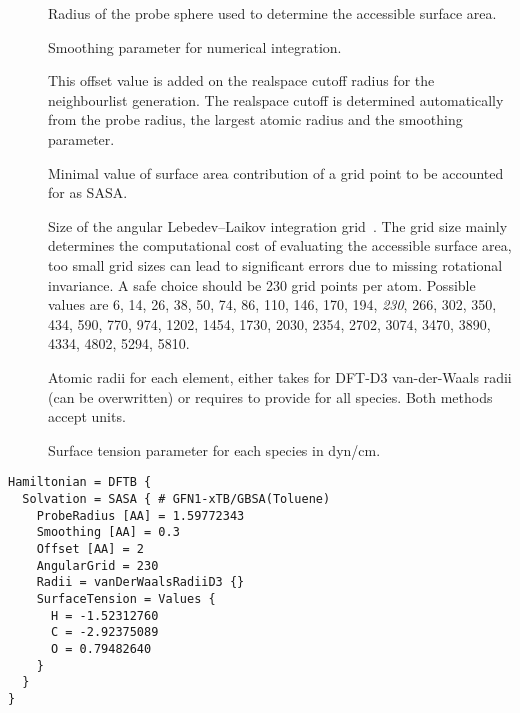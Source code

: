\begin{description}
  \item[] 
    Radius of the probe sphere used to determine the accessible surface area.

  \item[] 
    Smoothing parameter for numerical integration.

  \item[] 
    This offset value is added on the realspace cutoff radius for the
    neighbourlist generation.
    The realspace cutoff is determined automatically from the probe radius,
    the largest atomic radius and the smoothing parameter.

  \item[]
    Minimal value of surface area contribution of a grid point to be accounted
    for as SASA.

  \item[]
    Size of the angular Lebedev--Laikov integration grid~\cite{lebedev1999}.
    The grid size mainly determines the computational cost of evaluating the
    accessible surface area, too small grid sizes can lead to significant errors
    due to missing rotational invariance.
    A safe choice should be 230 grid points per atom.
    Possible values are
    6, 14, 26, 38, 50, 74, 86, 110, 146, 170, 194, \textit{230}, 266, 302, 350,
    434, 590, 770, 974, 1202, 1454, 1730, 2030, 2354, 2702, 3074, 3470, 3890,
    4334, 4802, 5294, 5810.

  \item[] Atomic radii for each element, either takes
     for DFT-D3 van-der-Waals radii (can be overwritten)
    or requires to provide  for all species.
    Both methods accept  units.

  \item[]
    Surface tension parameter for each species in dyn/cm.

\end{description}

\begin{verbatim}
Hamiltonian = DFTB {
  Solvation = SASA { # GFN1-xTB/GBSA(Toluene)
    ProbeRadius [AA] = 1.59772343
    Smoothing [AA] = 0.3
    Offset [AA] = 2
    AngularGrid = 230
    Radii = vanDerWaalsRadiiD3 {}
    SurfaceTension = Values {
      H = -1.52312760
      C = -2.92375089
      O = 0.79482640
    }
  }
}
\end{verbatim}


